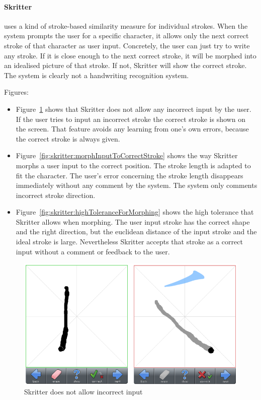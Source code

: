 \paragraph{Skritter} uses a kind of stroke-based similarity measure for 
individual strokes. When the system prompts the user for a specific character,
it allows only the next correct stroke of that character as user input. 
Concretely, the user can just try to write any stroke. If it is close enough to 
the next correct stroke, it will be morphed into an idealised picture of that 
stroke. If not, Skritter will show the correct stroke.
The system is clearly not a handwriting recognition system.

\noindent Figures:
\begin{itemize}
 \item 
 Figure~\ref{fig:skritter:noIncorrectInput} shows that Skritter does not allow
 any incorrect input by the user. If the user tries to input an incorrect stroke
 the correct stroke is shown on the screen. That feature avoids any learning 
 from one's own errors, because the correct stroke is always given.

 \item 
 Figure~\ref{fig:skritter:morphInputToCorrectStroke} shows the way Skritter 
 morphs a user input to the correct position. The stroke length is adapted to 
 fit the character. The user's error concerning the stroke length disappears 
immediately without any comment by the system. The system only comments incorrect
stroke direction.

 \item 
 Figure~\ref{fig:skritter:highToleranceForMorphing} shows the high tolerance that
 Skritter allows when morphing. The user input stroke has the 
 correct shape and the right  direction, but the euclidean distance of the 
 input stroke and the ideal stroke is large. Nevertheless Skritter accepts that 
 stroke as a correct input without a comment or feedback to the user.
\end{itemize}

\begin{figure}[htbp]
\begin{center}
\includegraphics[scale=0.7]{images/ConceptualDesign/skritter/noIncorrectInput.png}
\caption{Skritter does not allow incorrect input}
\label{fig:skritter:noIncorrectInput}
\end{center}
\end{figure}


